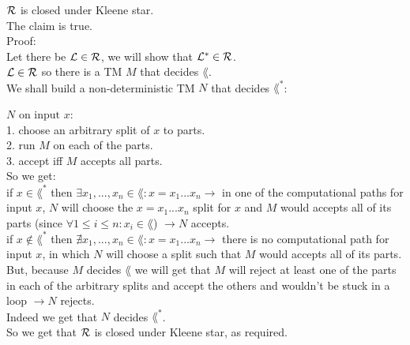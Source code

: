 $\mathcal{R}$ is closed under Kleene star. \\

The claim is true. \\

Proof: \\
Let there be $\mathcal{L} \in \mathcal{R}$, we will show that $\mathcal{L}^* \in \mathcal{R}$. \\
$\mathcal{L} \in \mathcal{R}$ so there is a TM $M$ that decides $\lang$. \\
We shall build a non-deterministic TM $N$ that decides $\lang^*$:

$N \text{ on input } x$: \\
1. choose an arbitrary split of $x$ to parts. \\
2. run $M$ on each of the parts. \\
3. accept iff $M$ accepts all parts. \\

So we get: \\
if $x \in \lang^*$ then
$\exists x_1,...,x_n \in \lang: x=x_1...x_n \rightarrow $ in one of the computational
paths for input $x$, $N$ will choose the $x=x_1...x_n$ split for $x$ and $M$ would accepts all of its parts
(since $\forall 1 \leq i \leq n: x_i \in \lang$) $\rightarrow N$ accepts. \\

if $x \notin \lang^*$  then
$\nexists x_1,...,x_n \in \lang: x=x_1...x_n \rightarrow $ there is no computational
path for input $x$, in which $N$ will choose a split such that $M$ would accepts all of its parts.
But, because $M$ decides $\lang$ we will get that $M$ will reject at least one of the parts in
each of the arbitrary splits and accept the others and wouldn't be stuck in a loop $\rightarrow N$ rejects. \\

Indeed we get that $N$ decides $\lang^*$. \\
So we get that  $\mathcal{R}$ is closed under Kleene star, as required. \\

